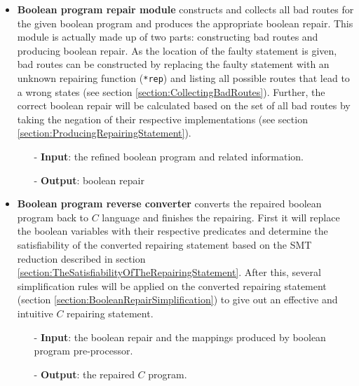 \begin{itemize}
\item \textbf{Boolean program repair module} constructs and collects all bad routes for the given boolean program and produces the appropriate boolean repair.
This module is actually made up of two parts: constructing bad routes and producing boolean repair.
As the location of the faulty statement is given, bad routes can be constructed by replacing the faulty statement with an unknown repairing function (\lstinline|*rep|) and listing all possible routes that lead to a wrong states (see section \ref{section:CollectingBadRoutes}).
Further, the correct boolean repair will be calculated based on the set of all bad routes by taking the negation of their respective implementations (see section \ref{section:ProducingRepairingStatement}).

\begin{itemize}
\item[-] \textbf{Input}: the refined boolean program and related information.
\item[-] \textbf{Output}: boolean repair
\end{itemize}

\item \textbf{Boolean program reverse converter} converts the repaired boolean program back to $C$ language and finishes the repairing. First it will replace the boolean variables with their respective predicates
and determine the satisfiability of the converted repairing statement based on the SMT reduction described in section \ref{section:TheSatisfiabilityOfTheRepairingStatement}.
After this, several simplification rules will be applied on the converted repairing statement (section \ref{section:BooleanRepairSimplification}) to give out an effective and intuitive $C$ repairing statement.

\begin{itemize}
\item[-] \textbf{Input}: the boolean repair and the mappings produced by boolean program pre-processor.
\item[-] \textbf{Output}: the repaired $C$ program.
\end{itemize}

\end{itemize}

